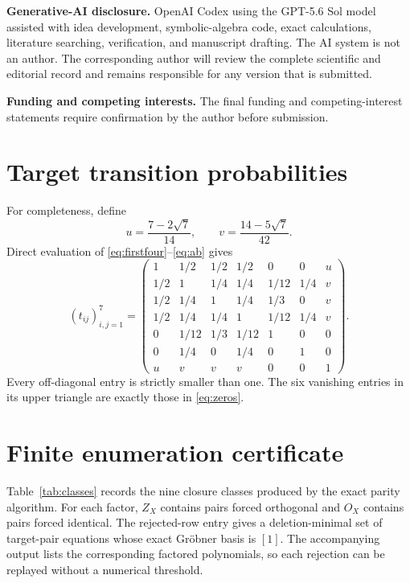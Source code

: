 \documentclass[11pt]{article}
\begin{document}
\medskip
\noindent\textbf{Generative-AI disclosure.}
OpenAI Codex using the GPT-5.6 Sol model assisted with idea development,
symbolic-algebra code, exact calculations, literature searching, verification,
and manuscript drafting.  The AI system is not an author.  The corresponding
author will review the complete scientific and editorial record and remains
responsible for any version that is submitted.

\medskip
\noindent\textbf{Funding and competing interests.}
The final funding and competing-interest statements require confirmation by
the author before submission.

\appendix

\section{Target transition probabilities}
\label{app:transitions}

For completeness, define
\begin{equation}
 u=\frac{7-2\sqrt7}{14},\qquad
 v=\frac{14-5\sqrt7}{42}.
\end{equation}
Direct evaluation of \eqref{eq:firstfour}--\eqref{eq:ab} gives
\begin{equation}
 (t_{ij})_{i,j=1}^7=
 \begin{pmatrix}
 1&1/2&1/2&1/2&0&0&u\\
 1/2&1&1/4&1/4&1/12&1/4&v\\
 1/2&1/4&1&1/4&1/3&0&v\\
 1/2&1/4&1/4&1&1/12&1/4&v\\
 0&1/12&1/3&1/12&1&0&0\\
 0&1/4&0&1/4&0&1&0\\
 u&v&v&v&0&0&1
 \end{pmatrix}.                                          \label{eq:tmatrix}
\end{equation}
Every off-diagonal entry is strictly smaller than one.  The six vanishing
entries in its upper triangle are exactly those in \eqref{eq:zeros}.

\section{Finite enumeration certificate}
\label{app:enumeration}

Table~\ref{tab:classes} records the nine closure classes produced by the exact
parity algorithm.  For each factor, $Z_X$ contains pairs forced orthogonal and
$O_X$ contains pairs forced identical.  The rejected-row entry gives a
deletion-minimal set of target-pair equations whose exact Gr\"obner basis is
$[1]$.  The accompanying output lists the corresponding factored polynomials,
so each rejection can be replayed without a numerical threshold.
\end{document}
